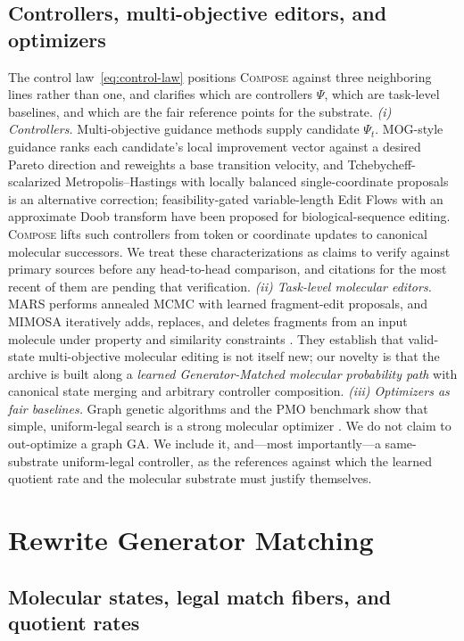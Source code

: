 \documentclass{article}
\newcommand{\method}{\textsc{Compose}\xspace}
\theoremstyle{definition}
\theoremstyle{remark}
\begin{document}
\subsection{Controllers, multi-objective editors, and optimizers}
\label{sec:controllers}

The control law~\eqref{eq:control-law} positions \method against three neighboring lines rather than one, and clarifies which are controllers $\Psi$, which are task-level baselines, and which are the fair reference points for the substrate. \emph{(i) Controllers.} Multi-objective guidance methods supply candidate $\Psi_t$. MOG-style guidance ranks each candidate's local improvement vector against a desired Pareto direction and reweights a base transition velocity, and Tchebycheff-scalarized Metropolis--Hastings with locally balanced single-coordinate proposals is an alternative correction; feasibility-gated variable-length Edit Flows with an approximate Doob transform have been proposed for biological-sequence editing. \method lifts such controllers from token or coordinate updates to canonical molecular successors. We treat these characterizations as claims to verify against primary sources before any head-to-head comparison, and citations for the most recent of them are pending that verification. \emph{(ii) Task-level molecular editors.} MARS performs annealed MCMC with learned fragment-edit proposals, and MIMOSA iteratively adds, replaces, and deletes fragments from an input molecule under property and similarity constraints \citep{xie2021mars,fu2021mimosa}. They establish that valid-state multi-objective molecular editing is not itself new; our novelty is that the archive is built along a \emph{learned Generator-Matched molecular probability path} with canonical state merging and arbitrary controller composition. \emph{(iii) Optimizers as fair baselines.} Graph genetic algorithms and the PMO benchmark show that simple, uniform-legal search is a strong molecular optimizer \citep{jensen2019graphga,gao2022pmo}. We do not claim to out-optimize a graph GA. We include it, and---most importantly---a same-substrate uniform-legal controller, as the references against which the learned quotient rate and the molecular substrate must justify themselves.

\section{Rewrite Generator Matching}

\subsection{Molecular states, legal match fibers, and quotient rates}
\end{document}
